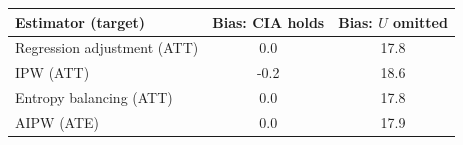 \begin{tabular}{lcc}\toprule
Estimator (target) & Bias: CIA holds & Bias: $U$ omitted \\ \midrule
Regression adjustment (ATT) & 0.0 & 17.8 \\
IPW (ATT) & -0.2 & 18.6 \\
Entropy balancing (ATT) & 0.0 & 17.8 \\
AIPW (ATE) & 0.0 & 17.9 \\
\bottomrule\end{tabular}
